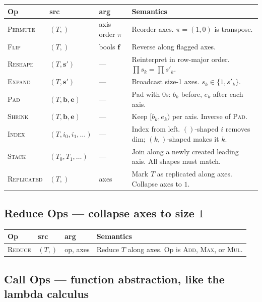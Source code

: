\documentclass[10pt,letterpaper]{article}
\newcommand{\op}[1]{\textsc{#1}}
\begin{document}
\begin{tabular}{@{}l l l l@{}}
\toprule
\textbf{Op} & \textbf{src} & \textbf{arg} & \textbf{Semantics} \\
\midrule
\op{Permute} & $(T,)$ & axis order $\pi$ & Reorder axes. $\pi = (1,0)$ is transpose. \\
\op{Flip} & $(T,)$ & bools $\mathbf{f}$ & Reverse along flagged axes. \\
\op{Reshape} & $(T, \mathbf{s'})$ & --- & Reinterpret in row-major order. $\prod s_k = \prod s'_k$. \\
\op{Expand} & $(T, \mathbf{s'})$ & --- & Broadcast size-1 axes. $s_k \in \{1, s'_k\}$. \\
\op{Pad} & $(T, \mathbf{b}, \mathbf{e})$ & --- & Pad with $0$s: $b_k$ before, $e_k$ after each axis. \\
\op{Shrink} & $(T, \mathbf{b}, \mathbf{e})$ & --- & Keep $[b_k, e_k)$ per axis. Inverse of \op{Pad}. \\
\op{Index} & $(T, i_0, i_1, \ldots)$ & --- & Index from left. $()$-shaped $i$ removes dim; $(k,)$-shaped makes it $k$. \\
\op{Stack} & $(T_0, T_1, \ldots)$ & --- & Join along a newly created leading axis. All shapes must match. \\
\op{Replicated} & $(T,)$ & axes & Mark $T$ as replicated along axes. Collapse axes to $1$. \\
\bottomrule
\end{tabular}

\subsection*{{\color{reducered}Reduce Ops} \normalfont\small--- collapse axes to size $1$}

\begin{tabular}{@{}l l l l@{}}
\toprule
\textbf{Op} & \textbf{src} & \textbf{arg} & \textbf{Semantics} \\
\midrule
\op{Reduce} & $(T,)$ & op, axes & Reduce $T$ along axes. Op is \op{Add}, \op{Max}, or \op{Mul}. \\
\bottomrule
\end{tabular}

\subsection*{{\color{callblue}Call Ops} \normalfont\small--- function abstraction, like the lambda calculus}
\end{document}
